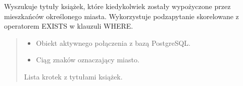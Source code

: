 \documentclass[a4paper,11pt,english,openany,oneside]{sphinxmanual}
\begin{document}
\begin{savenotes}\begin{fulllineitems}
\label{\detokenize{rozdzial_5/index:biblioteka_zapytania.get_ksiazki_wypozyczone_w_miescie}}
\pysigstartsignatures
\pysiglinewithargsret
{}
{\sphinxparamcomma {}}
{}
\pysigstopsignatures
\sphinxAtStartPar
Wyszukuje tytuły książek, które kiedykolwiek zostały wypożyczone przez mieszkańców określonego miasta.
Wykorzystuje podzapytanie skorelowane z operatorem EXISTS w klauzuli WHERE.

\sphinxAtStartPar
{}

\begin{sphinxVerbatim}[commandchars=\\\{\}]
\end{sphinxVerbatim}
\begin{quote}\begin{description}
\begin{itemize}
\item {} 
\sphinxAtStartPar
{} \textendash{} Obiekt aktywnego połączenia z bazą PostgreSQL.

\item {} 
\sphinxAtStartPar
{} \textendash{} Ciąg znaków oznaczający miasto.

\end{itemize}

\sphinxAtStartPar
Lista krotek z tytułami książek.

\end{description}\end{quote}

\end{fulllineitems}\end{savenotes}
\end{document}
